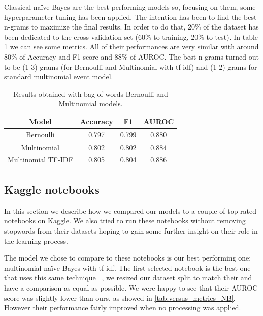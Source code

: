 \documentclass{article}
\begin{document}
    Classical na\"ive Bayes are the best performing models so, focusing on them, some hyperparameter tuning has been applied. The intention has been to find the best n-grams to maximize the final results. In order to do that, 20\% of the dataset has been dedicated to the cross validation set (60\% to training, 20\% to test).
    In table \ref{tab:classic_nb_vs_embeddings} we can see some metrics. 
    All of their performances are very similar with around 80\% of Accuracy and F1-score and 88\% of AUROC. The best n-grams turned out to be (1-3)-grams (for Bernoulli and Multinomial with tf-idf) and (1-2)-grams for standard multinomial event model.
    
    \begin{table}[h!t]
        \centering
        \caption{Results obtained with bag of words Bernoulli and Multinomial models.}
        \label{tab:classic_nb_vs_embeddings}
        \begin{tabular}{c|ccc}
            \hline
            Model & Accuracy & F1 & AUROC \\
            \hline 
            Bernoulli & 0.797 & 0.799 & 0.880 \\ 
            Multinomial & 0.802 & 0.802 & 0.884 \\ 
            Multinomial TF-IDF & 0.805 & 0.804 & 0.886 \\ 
            \hline
        \end{tabular}
    \end{table}
    
    \subsection*{Kaggle notebooks}
    
    In this section we describe how we compared our models to a couple of top-rated notebooks on Kaggle.
    We also tried to run these notebooks without removing stopwords from their datasets hoping to gain some further insight on their role in the learning process. 
    
    The model we chose to compare to these notebooks is our best performing one: multinomial na\"ive Bayes with tf-idf. 
    The first selected notebook is the best one that uses this same technique ~\cite{startups:notebook1}, we resized our dataset split to match their and have a comparison as equal as possible.
    We were happy to see that their AUROC score was slightly lower than ours, as showed in \ref{tab:versus_metrics_NB}.
    However their performance fairly improved when no processing was applied.
    
\end{document}
